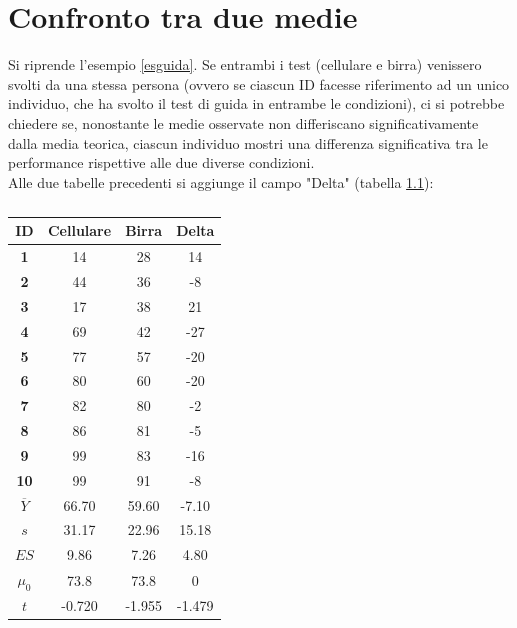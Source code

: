 \documentclass[10pt, draft]{book}
\begin{document}
\chapter{Confronto tra due medie}\label{capconfrontoduemedie}
Si riprende l'esempio \ref{esguida}. Se entrambi i test (cellulare e birra) venissero svolti da una stessa persona (ovvero se ciascun ID facesse riferimento ad un unico individuo, che ha svolto il test di guida in entrambe le condizioni), ci si potrebbe chiedere se, nonostante le medie osservate non differiscano significativamente dalla media teorica, ciascun individuo mostri una differenza significativa tra le performance rispettive alle due diverse condizioni.
\\
Alle due tabelle precedenti si aggiunge il campo "Delta" (tabella \ref{tabguida3}):
\begin{table}[H]
    \centering
    \renewcommand\arraystretch{1.2}
    \begin{tabular}{c|c|c||c}
    \hline
    \textbf{ID}& \textbf{Cellulare} & \textbf{Birra} & \textbf{Delta}\\
    \hline
    \textbf{1} & 14 & 28 & 14\\
    \hline
    \textbf{2} & 44 & 36 & -8\\
    \hline
    \textbf{3} & 17 & 38 & 21\\
    \hline
    \textbf{4} & 69 & 42 & -27\\
    \hline
    \textbf{5} & 77 & 57 & -20\\
    \hline
    \textbf{6} & 80 & 60 & -20\\
    \hline
    \textbf{7} & 82 & 80 & -2\\
    \hline
    \textbf{8} & 86 & 81 & -5\\
    \hline
    \textbf{9} & 99 & 83 & -16\\
    \hline
    \textbf{10} & 99 & 91 & -8\\
    \hline
    \hline
    \textbf{$\overline{Y}$} & 66.70 & 59.60 & -7.10\\
    \hline
    \textbf{$s$} & 31.17 & 22.96 & 15.18\\
    \hline
    \textbf{$ES$} & 9.86 & 7.26 & 4.80\\
    \hline
    \textbf{$\mu_0$} & 73.8 & 73.8 & 0\\
    \hline
    \textbf{$t$} & -0.720 & -1.955 & -1.479\\
    \hline
    \end{tabular}
    \caption{\small{}}
    \label{tabguida3}
\end{table}\noindent
\end{document}
